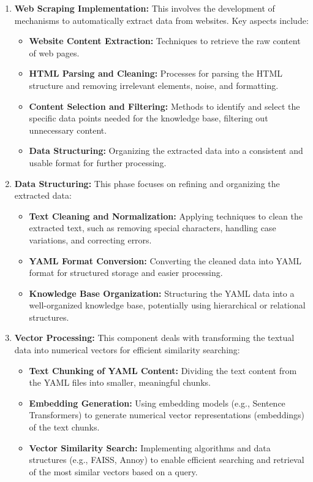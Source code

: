 \documentclass[12pt,a4paper]{report}
\begin{document}
\begin{enumerate}
    \item \textbf{Web Scraping Implementation:} This involves the development of mechanisms to automatically extract data from websites. Key aspects include:
    \begin{itemize}[label=$\bullet$, leftmargin=*]
        \item \textbf{Website Content Extraction:} Techniques to retrieve the raw content of web pages.
        \item \textbf{HTML Parsing and Cleaning:} Processes for parsing the HTML structure and removing irrelevant elements, noise, and formatting.
        \item \textbf{Content Selection and Filtering:} Methods to identify and select the specific data points needed for the knowledge base, filtering out unnecessary content.
        \item \textbf{Data Structuring:} Organizing the extracted data into a consistent and usable format for further processing.
    \end{itemize}

    \item \textbf{Data Structuring:} This phase focuses on refining and organizing the extracted data:
    \begin{itemize}[label=$\bullet$, leftmargin=*]
        \item \textbf{Text Cleaning and Normalization:} Applying techniques to clean the extracted text, such as removing special characters, handling case variations, and correcting errors.
        \item \textbf{YAML Format Conversion:} Converting the cleaned data into YAML format for structured storage and easier processing.
        \item \textbf{Knowledge Base Organization:} Structuring the YAML data into a well-organized knowledge base, potentially using hierarchical or relational structures.
    \end{itemize}

    \item \textbf{Vector Processing:} This component deals with transforming the textual data into numerical vectors for efficient similarity searching:
    \begin{itemize}[label=$\bullet$, leftmargin=*]
        \item \textbf{Text Chunking of YAML Content:} Dividing the text content from the YAML files into smaller, meaningful chunks.
        \item \textbf{Embedding Generation:} Using embedding models (e.g., Sentence Transformers) to generate numerical vector representations (embeddings) of the text chunks.
        \item \textbf{Vector Similarity Search:} Implementing algorithms and data structures (e.g., FAISS, Annoy) to enable efficient searching and retrieval of the most similar vectors based on a query.
    \end{itemize}


\end{enumerate}
\end{document}
